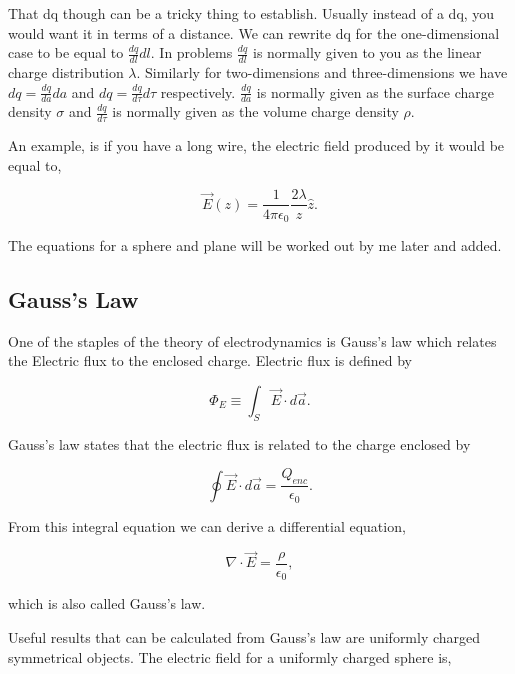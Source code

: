 \documentclass[preprint, review,12pt]{elsarticle}
\begin{document}
That dq though can be a tricky thing to establish. Usually instead of a dq, you would want it in terms of a distance. We can rewrite dq for the one-dimensional case to be equal to $\frac{dq}{dl} dl$. In problems $\frac{dq}{dl}$ is normally given to you as the linear charge distribution $\lambda$. Similarly for two-dimensions and three-dimensions we have $dq = \frac{dq}{da}da$ and $dq = \frac{dq}{d\tau}d\tau$ respectively. $\frac{dq}{da}$ is normally given as the surface charge density $\sigma$ and $\frac{dq}{d\tau}$ is normally given as the volume charge density $\rho$.


An example, is if you have a long wire, the electric field produced by it would be equal to,

\begin{equation}
    \vec{E}(z) = \frac{1}{4 \pi \epsilon_0} \frac{2\lambda}{z} \hat{z}.
\end{equation}

The equations for a sphere and plane will be worked out by me later and added.

\subsection{Gauss's Law}

One of the staples of the theory of electrodynamics is Gauss's law which relates the Electric flux to the enclosed charge. Electric flux is defined by

\begin{equation}
    \Phi_E \equiv \int_S \vec{E}\cdot d\vec{a}.
\end{equation}

Gauss's law states that the electric flux is related to the charge enclosed by

\begin{equation}
    \oint \vec{E}\cdot d\vec{a} = \frac{Q_{enc}}{\epsilon_0}.
\end{equation}

From this integral equation we can derive a differential equation,

\begin{equation}
    \nabla \cdot \vec{E} = \frac{\rho}{\epsilon_0},
\end{equation}

which is also called Gauss's law. 

Useful results that can be calculated from Gauss's law are uniformly charged symmetrical objects. The electric field for a uniformly charged sphere is,
\end{document}
